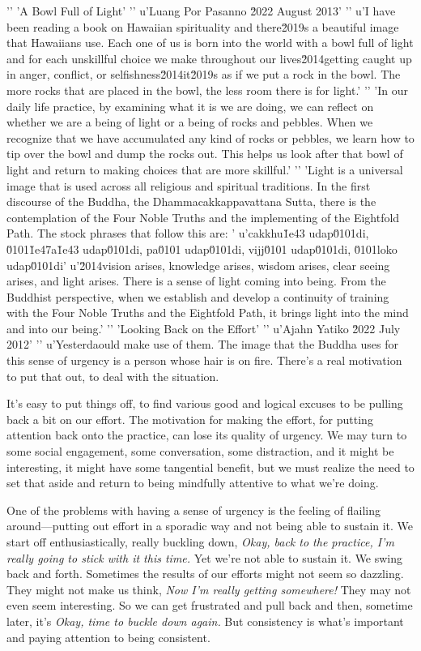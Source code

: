 '\n'
'A Bowl Full of Light'
'\n'
u'Luang Por Pasanno \u2022 August 2013'
'\n'
u'I have been reading a book on Hawaiian spirituality and there\u2019s a beautiful image that Hawaiians use. Each one of us is born into the world with a bowl full of light and for each unskillful choice we make throughout our lives\u2014getting caught up in anger, conflict, or selfishness\u2014it\u2019s as if we put a rock in the bowl. The more rocks that are placed in the bowl, the less room there is for light.'
'\n'
'In our daily life practice, by examining what it is we are doing, we can reflect on whether we are a being of light or a being of rocks and pebbles. When we recognize that we have accumulated any kind of rocks or pebbles, we learn how to tip over the bowl and dump the rocks out. This helps us look after that bowl of light and return to making choices that are more skillful.'
'\n'
'Light is a universal image that is used across all religious and spiritual traditions. In the first discourse of the Buddha, the Dhammacakkappavattana Sutta, there is the contemplation of the Four Noble Truths and the implementing of the Eightfold Path. The stock phrases that follow this are: '
u'cakkhu\u1e43 udap\u0101di, \u0101\u1e47a\u1e43 udap\u0101di, pa\u0101 udap\u0101di, vijj\u0101 udap\u0101di, \u0101loko udap\u0101di'
u'\u2014vision arises, knowledge arises, wisdom arises, clear seeing arises, and light arises. There is a sense of light coming into being. From the Buddhist perspective, when we establish and develop a continuity of training with the Four Noble Truths and the Eightfold Path, it brings light into the mind and into our being.'
'\n'
'Looking Back on the Effort'
'\n'
u'Ajahn Yatiko \u2022 July 2012'
'\n'
u'Yesterdaould make use of them. The image that 
the Buddha uses for this sense of urgency is a person whose hair is on 
fire. There's a real motivation to put that out, to deal with the 
situation.

It's easy to put things off, to find various good and logical excuses 
to be pulling back a bit on our effort. The motivation for making the 
effort, for putting attention back onto the practice, can lose its 
quality of urgency. We may turn to some social engagement, some 
conversation, some distraction, and it might be interesting, it might 
have some tangential benefit, but we must realize the need to set that 
aside and return to being mindfully attentive to what we're doing.

One of the problems with having a sense of urgency is the feeling of 
flailing around---putting out effort in a sporadic way and not being 
able to sustain it. We start off enthusiastically, really buckling 
down, \emph{Okay, back to the practice, I'm really going to stick with 
it this time.} Yet we're not able to sustain it. We swing back and 
forth. Sometimes the results of our efforts might not seem so dazzling. 
They might not make us think, \emph{Now I'm really getting somewhere!} 
They may not even seem interesting. So we can get frustrated and pull 
back and then, sometime later, it's \emph{Okay, time to buckle down 
again.} But consistency is what's important and paying attention to 
being consistent.

